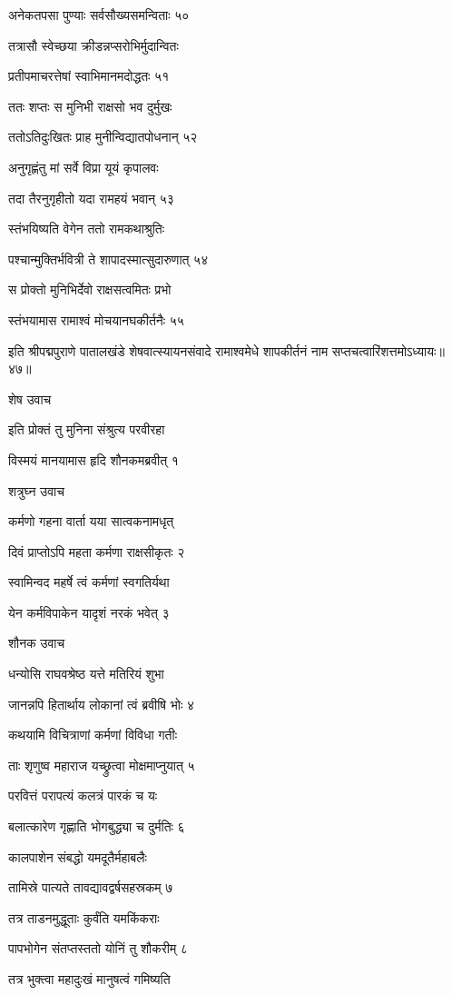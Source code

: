 अनेकतपसा पुण्याः सर्वसौख्यसमन्विताः ५०

तत्रासौ स्वेच्छया क्रीडन्नप्सरोभिर्मुदान्वितः

प्रतीपमाचरत्तेषां स्वाभिमानमदोद्धतः ५१

ततः शप्तः स मुनिभी राक्षसो भव दुर्मुखः

ततोऽतिदुःखितः प्राह मुनीन्विद्यातपोधनान् ५२

अनुगृह्णंतु मां सर्वे विप्रा यूयं कृपालवः

तदा तैरनुगृहीतो यदा रामहयं भवान् ५३

स्तंभयिष्यति वेगेन ततो रामकथाश्रुतिः

पश्चान्मुक्तिर्भवित्री ते शापादस्मात्सुदारुणात् ५४

स प्रोक्तो मुनिभिर्देवो राक्षसत्वमितः प्रभो

स्तंभयामास रामाश्वं मोचयानघकीर्तनैः ५५

इति श्रीपद्मपुराणे पातालखंडे शेषवात्स्यायनसंवादे रामाश्वमेधे शापकीर्तनं नाम सप्तचत्वारिंशत्तमोऽध्यायः॥४७॥


शेष उवाच

इति प्रोक्तं तु मुनिना संश्रुत्य परवीरहा

विस्मयं मानयामास हृदि शौनकमब्रवीत् १

शत्रुघ्न उवाच

कर्मणो गहना वार्ता यया सात्वकनामधृत्

दिवं प्राप्तोऽपि महता कर्मणा राक्षसीकृतः २

स्वामिन्वद महर्षे त्वं कर्मणां स्वगतिर्यथा

येन कर्मविपाकेन यादृशं नरकं भवेत् ३

शौनक उवाच

धन्योसि राघवश्रेष्ठ यत्ते मतिरियं शुभा

जानन्नपि हितार्थाय लोकानां त्वं ब्रवीषि भोः ४

कथयामि विचित्राणां कर्मणां विविधा गतीः

ताः शृणुष्व महाराज यच्छ्रुत्वा मोक्षमाप्नुयात् ५

परवित्तं परापत्यं कलत्रं पारकं च यः

बलात्कारेण गृह्णाति भोगबुद्ध्या च दुर्मतिः ६

कालपाशेन संबद्धो यमदूतैर्महाबलैः

तामिस्रे पात्यते तावद्यावद्वर्षसहस्रकम् ७

तत्र ताडनमुद्धूताः कुर्वंति यमकिंकराः

पापभोगेन संतप्तस्ततो योनिं तु शौकरीम् ८

तत्र भुक्त्वा महादुःखं मानुषत्वं गमिष्यति

